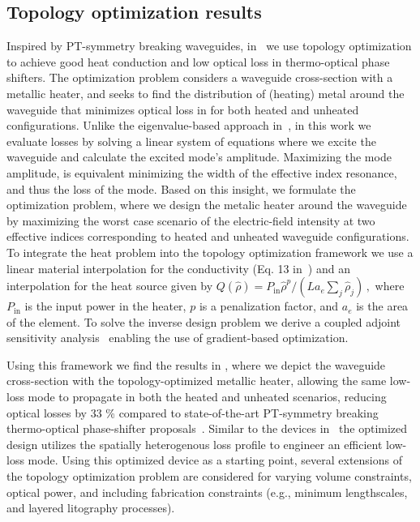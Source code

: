 \subsection*{Topology optimization results~\cite{ownpub0}}

Inspired by PT-symmetry breaking waveguides, in~\cite{ownpub0} we use topology optimization to achieve good heat conduction and low optical loss in thermo-optical phase shifters.
The optimization problem considers a waveguide cross-section with a metallic heater, and seeks to find the distribution of (heating) metal around the waveguide that minimizes optical loss in for both heated and 
unheated configurations. Unlike the eigenvalue-based approach in~\cite{lipson}, in this work we evaluate losses by solving a linear system of equations where we excite the waveguide 
and calculate the excited mode's 
amplitude. Maximizing the mode amplitude, is equivalent minimizing the width of the effective 
index resonance, and thus the loss of the mode. Based on this insight, we formulate the optimization problem, where we design the metalic heater around the waveguide by maximizing the worst case scenario 
of the electric-field intensity at two effective indices corresponding to heated and unheated 
waveguide configurations. To integrate the heat problem into the topology optimization framework we use a linear material interpolation 
for the conductivity (Eq. 13 in~\cite{ownpub0}) and an interpolation for the heat source given by $
    Q(\hat{\rho})=P_{\text{in}} \hat{\rho}^p / \left( L a_e \sum_j \hat{\rho}_j \right)\,,
$
where $P_\text{in}$ is the input power in the heater, $p$ is a penalization factor, and $a_e$ is the area of the element. To solve the inverse design
problem we derive a coupled adjoint sensitivity analysis~\cite{ownpub0} enabling the use of gradient-based optimization.

Using this framework we find the results in , where we depict the waveguide cross-section with the topology-optimized metallic heater,
allowing the same low-loss mode to propagate in both the heated and unheated scenarios,
reducing optical losses by 33 \% compared to state-of-the-art PT-symmetry breaking thermo-optical phase-shifter proposals~\cite{lipson}. Similar to the devices
in~\cite{lipson} the optimized design utilizes the spatially heterogenous loss profile to engineer an efficient low-loss mode. Using this optimized device as a starting point, several extensions of the topology optimization problem are considered for varying volume constraints, optical power, and including fabrication constraints (e.g., minimum lengthscales, and layered 
litography processes).

